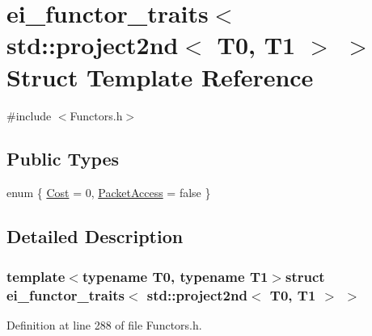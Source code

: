 \hypertarget{structei__functor__traits_3_01std_1_1project2nd_3_01_t0_00_01_t1_01_4_01_4}{\section{ei\-\_\-functor\-\_\-traits$<$ std\-:\-:project2nd$<$ T0, T1 $>$ $>$ Struct Template Reference}
\label{structei__functor__traits_3_01std_1_1project2nd_3_01_t0_00_01_t1_01_4_01_4}
}


{\ttfamily \#include $<$Functors.\-h$>$}

\subsection*{Public Types}
\begin{DoxyCompactItemize}
\item 
enum \{ \hyperlink{structei__functor__traits_3_01std_1_1project2nd_3_01_t0_00_01_t1_01_4_01_4_a859f3fc2b6203356ea0895ca3a29d58ba03fc0dab7552e2c15b3e26d511fc456c}{Cost} = 0, 
\hyperlink{structei__functor__traits_3_01std_1_1project2nd_3_01_t0_00_01_t1_01_4_01_4_a859f3fc2b6203356ea0895ca3a29d58ba3fcc9c861a5771ad71ae45fd61e422ae}{Packet\-Access} = false
 \}
\end{DoxyCompactItemize}


\subsection{Detailed Description}
\subsubsection*{template$<$typename T0, typename T1$>$struct ei\-\_\-functor\-\_\-traits$<$ std\-::project2nd$<$ T0, T1 $>$ $>$}



Definition at line 288 of file Functors.\-h.



